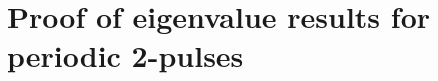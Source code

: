 \documentclass[11pt,reqno,oneside]{report}
\theoremstyle{plain}
\theoremstyle{definition}
\theoremstyle{remark}
\numberwithin{section}{chapter}
\numberwithin{equation}{chapter}
\numberwithin{figure}{chapter}
\begin{document}
\chapter{Proof of eigenvalue results for periodic 2-pulses}\label{per2pproof}


% 




\end{document}
